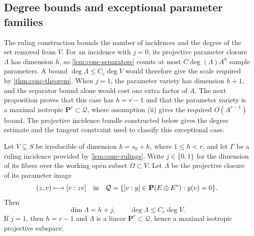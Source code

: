 \subsection{Degree bounds and exceptional parameter families}
\label{subsec:conc-deg-section}

The ruling construction bounds the number of incidences and the degree of the set removed from $V$. For an incidence with $j=0$, its projective parameter closure $\Lambda$ has dimension $h$, so \cref{lem:conc-separators} counts at most $C\deg(\Lambda)A^h$ sample parameters. A bound $\deg\Lambda\le C_e\deg V$ would therefore give the scale required by \cref{thm:conc-theorem}. When $j=1$, the parameter variety has dimension $h+1$, and the separator bound alone would cost one extra factor of $A$. The next proposition proves that this case has $h=r-1$ and that the parameter variety is a maximal isotropic $\mathbf{P}^r\subset\mathcal{Q}$, where assumption (ii) gives the required $O(A^{r-1})$ bound. The projective incidence bundle constructed below gives the degree estimate and the tangent constraint used to classify this exceptional case.

\begin{proposition}
\label{prop:conc-degree}
Let $V\subsetneq S$ be irreducible of dimension $k=s_0+h$, where $1\le h<r$, and let $\Gamma$ be a ruling incidence provided by \cref{lem:conc-rulings}.  Write $j\in\{0,1\}$ for the dimension of its fibers over the working open subset $\Omega\subset V$. Let $\Lambda$ be the projective closure of its parameter image
\[
 (z,v)\longmapsto[v:zv]
 \quad\hbox{in}\quad
 \mathcal{Q}=\{[v:y]\in\mathbf{P}(E\oplus E^*):y(v)=0\}.
\]
Then
\[
 \dim\Lambda=h+j,
 \qquad \deg\Lambda\le C_e\deg V.
\]
If $j=1$, then $h=r-1$ and $\Lambda$ is a linear $\mathbf{P}^r\subset\mathcal{Q}$, hence a maximal isotropic projective subspace.
\end{proposition}

